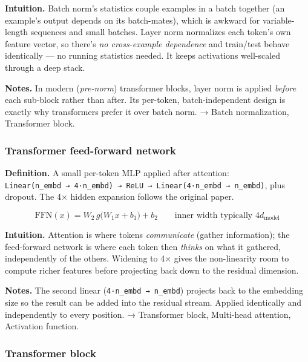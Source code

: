 \documentclass[
  10pt,
  letterpaper,
  onecolumn]{article}
\begin{document}
\textbf{Intuition.} Batch norm's statistics couple examples in a batch
together (an example's output depends on its batch-mates), which is
awkward for variable-length sequences and small batches. Layer norm
normalizes each token's own feature vector, so there's \emph{no
cross-example dependence} and train/test behave identically --- no
running statistics needed. It keeps activations well-scaled through a
deep stack.

\textbf{Notes.} In modern (\emph{pre-norm}) transformer blocks, layer
norm is applied \emph{before} each sub-block rather than after. Its
per-token, batch-independent design is exactly why transformers prefer
it over batch norm. → Batch normalization, Transformer block.

\hypertarget{transformer-feed-forward-network}{%
\subsubsection{Transformer feed-forward
network}\label{transformer-feed-forward-network}}

\textbf{Definition.} A small per-token MLP applied after attention:
\texttt{Linear(n\_embd\ →\ 4·n\_embd)\ →\ ReLU\ →\ Linear(4·n\_embd\ →\ n\_embd)},
plus dropout. The 4× hidden expansion follows the original paper.

\begin{equation*}
\mathrm{FFN}(x)=W_2\,g\bigl(W_1x+b_1\bigr)+b_2
\qquad\text{inner width typically }4d_{\text{model}}
\end{equation*}

\textbf{Intuition.} Attention is where tokens \emph{communicate} (gather
information); the feed-forward network is where each token then
\emph{thinks} on what it gathered, independently of the others. Widening
to 4× gives the non-linearity room to compute richer features before
projecting back down to the residual dimension.

\textbf{Notes.} The second linear (\texttt{4·n\_embd\ →\ n\_embd})
projects back to the embedding size so the result can be added into the
residual stream. Applied identically and independently to every
position. → Transformer block, Multi-head attention, Activation
function.

\hypertarget{transformer-block}{%
\subsubsection{Transformer block}\label{transformer-block}}
\end{document}
